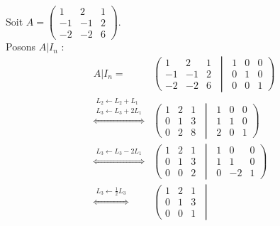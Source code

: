 \begin{example}
	Soit 
	$
	A =
	\begin{pmatrix}
		1 & 2 & 1 \\
		-1 & -1 & 2 \\
		-2 & -2 & 6
	\end{pmatrix}
	$.
	\\
	Posons $A | I_n$ :
	\begin{align*}
		A | I_n = 
		&\left( 
		\begin{matrix}
			1 & 2 & 1 \\
			-1 & -1 & 2 \\
			-2 & -2 & 6
		\end{matrix}
		\ \middle| \
		\begin{matrix}
			1 & 0 & 0 \\
			0 & 1 & 0 \\
			0 & 0 & 1
		\end{matrix}
		\right) \\
		\overset{\substack{L_2 \leftarrow L_2 + L_1 \\ L_3 \leftarrow L_3 + 2 L_1}}{\iff}
		&\left(
		\begin{matrix}
			1 & 2 & 1 \\
			0 & 1 & 3 \\
			0 & 2 & 8
		\end{matrix}
		\ \middle| \ 
		\begin{matrix}
			1 & 0 & 0 \\
			1 & 1 & 0 \\
			2 & 0 & 1
		\end{matrix}
		\right) \\
		\overset{\substack{L_3 \leftarrow L_3 - 2 L_1}}{\iff} 
		&\left(
		\begin{matrix}
			1 & 2 & 1 \\
			0 & 1 & 3 \\
			0 & 0 & 2
		\end{matrix}
		\ \middle| \ 
		\begin{matrix}
			1 & 0 & 0 \\
			1 & 1 & 0 \\
			0 & -2 & 1
		\end{matrix}
		\right) \\
		\overset{\substack{L_3 \leftarrow \frac{1}{2} L_3}}{\iff} 
		&\left(
		\begin{matrix}
			1 & 2 & 1 \\
			0 & 1 & 3 \\
			0 & 0 & 1
		\end{matrix}
		\ \middle| \

\end{align*}
\end{example}
